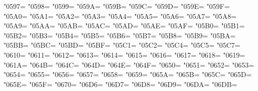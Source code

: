 \XeTeXcharclass"0597=\KclassCM
\XeTeXcharclass"0598=\KclassCM
\XeTeXcharclass"0599=\KclassCM
\XeTeXcharclass"059A=\KclassCM
\XeTeXcharclass"059B=\KclassCM
\XeTeXcharclass"059C=\KclassCM
\XeTeXcharclass"059D=\KclassCM
\XeTeXcharclass"059E=\KclassCM
\XeTeXcharclass"059F=\KclassCM
\XeTeXcharclass"05A0=\KclassCM
\XeTeXcharclass"05A1=\KclassCM
\XeTeXcharclass"05A2=\KclassCM
\XeTeXcharclass"05A3=\KclassCM
\XeTeXcharclass"05A4=\KclassCM
\XeTeXcharclass"05A5=\KclassCM
\XeTeXcharclass"05A6=\KclassCM
\XeTeXcharclass"05A7=\KclassCM
\XeTeXcharclass"05A8=\KclassCM
\XeTeXcharclass"05A9=\KclassCM
\XeTeXcharclass"05AA=\KclassCM
\XeTeXcharclass"05AB=\KclassCM
\XeTeXcharclass"05AC=\KclassCM
\XeTeXcharclass"05AD=\KclassCM
\XeTeXcharclass"05AE=\KclassCM
\XeTeXcharclass"05AF=\KclassCM
\XeTeXcharclass"05B0=\KclassCM
\XeTeXcharclass"05B1=\KclassCM
\XeTeXcharclass"05B2=\KclassCM
\XeTeXcharclass"05B3=\KclassCM
\XeTeXcharclass"05B4=\KclassCM
\XeTeXcharclass"05B5=\KclassCM
\XeTeXcharclass"05B6=\KclassCM
\XeTeXcharclass"05B7=\KclassCM
\XeTeXcharclass"05B8=\KclassCM
\XeTeXcharclass"05B9=\KclassCM
\XeTeXcharclass"05BA=\KclassCM
\XeTeXcharclass"05BB=\KclassCM
\XeTeXcharclass"05BC=\KclassCM
\XeTeXcharclass"05BD=\KclassCM
\XeTeXcharclass"05BF=\KclassCM
\XeTeXcharclass"05C1=\KclassCM
\XeTeXcharclass"05C2=\KclassCM
\XeTeXcharclass"05C4=\KclassCM
\XeTeXcharclass"05C5=\KclassCM
\XeTeXcharclass"05C7=\KclassCM
\XeTeXcharclass"0610=\KclassCM
\XeTeXcharclass"0611=\KclassCM
\XeTeXcharclass"0612=\KclassCM
\XeTeXcharclass"0613=\KclassCM
\XeTeXcharclass"0614=\KclassCM
\XeTeXcharclass"0615=\KclassCM
\XeTeXcharclass"0616=\KclassCM
\XeTeXcharclass"0617=\KclassCM
\XeTeXcharclass"0618=\KclassCM
\XeTeXcharclass"0619=\KclassCM
\XeTeXcharclass"061A=\KclassCM
\XeTeXcharclass"064B=\KclassCM
\XeTeXcharclass"064C=\KclassCM
\XeTeXcharclass"064D=\KclassCM
\XeTeXcharclass"064E=\KclassCM
\XeTeXcharclass"064F=\KclassCM
\XeTeXcharclass"0650=\KclassCM
\XeTeXcharclass"0651=\KclassCM
\XeTeXcharclass"0652=\KclassCM
\XeTeXcharclass"0653=\KclassCM
\XeTeXcharclass"0654=\KclassCM
\XeTeXcharclass"0655=\KclassCM
\XeTeXcharclass"0656=\KclassCM
\XeTeXcharclass"0657=\KclassCM
\XeTeXcharclass"0658=\KclassCM
\XeTeXcharclass"0659=\KclassCM
\XeTeXcharclass"065A=\KclassCM
\XeTeXcharclass"065B=\KclassCM
\XeTeXcharclass"065C=\KclassCM
\XeTeXcharclass"065D=\KclassCM
\XeTeXcharclass"065E=\KclassCM
\XeTeXcharclass"065F=\KclassCM
\XeTeXcharclass"0670=\KclassCM
\XeTeXcharclass"06D6=\KclassCM
\XeTeXcharclass"06D7=\KclassCM
\XeTeXcharclass"06D8=\KclassCM
\XeTeXcharclass"06D9=\KclassCM
\XeTeXcharclass"06DA=\KclassCM
\XeTeXcharclass"06DB=\KclassCM
